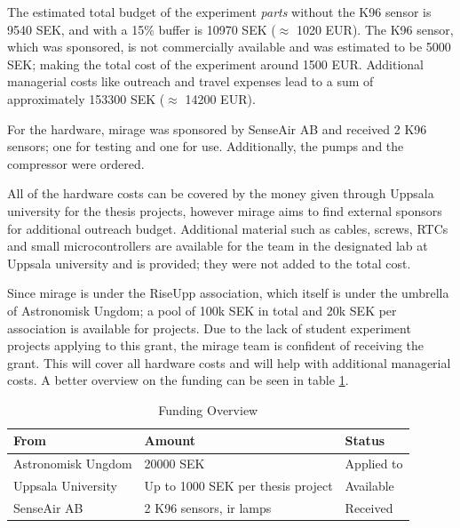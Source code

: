 The estimated total budget of the experiment \emph{parts} without the K96 sensor is 9540 SEK, and with a 15\% buffer is 10970 SEK ($\approx$ 1020 EUR). The K96 sensor, which was sponsored, is not commercially available and was estimated to be 5000 SEK; making the total cost of the experiment around 1500 EUR. Additional managerial costs like outreach and travel expenses lead to a sum of approximately 153300 SEK ($\approx$ 14200 EUR).

For the hardware, \gls{mirage} was sponsored by SenseAir AB and received 2 K96 sensors; one for testing and one for use. Additionally, the pumps and the compressor were ordered.

All of the hardware costs can be covered by the money given through Uppsala university for the thesis projects, however \gls{mirage} aims to find external sponsors for additional outreach budget. Additional material such as cables, screws, RTCs and small microcontrollers are available for the team in the designated lab at Uppsala university and is provided; they were not added to the total cost.

Since \gls{mirage} is under the RiseUpp association, which itself is under the umbrella of Astronomisk Ungdom; a pool of 100k SEK in total and 20k SEK per association is available for projects.
Due to the lack of student experiment projects applying to this grant, the \gls{mirage} team is confident of receiving the grant. This will cover all hardware costs and will help with additional managerial costs.
A better overview on the funding can be seen in table \ref{tab:funding}.

\begin{table}[htbp]
\centering
\caption{Funding Overview}
\label{tab:funding}
\begin{tabular}{p{4cm}p{6cm}p{3cm}}
\toprule
\textbf{From} & \textbf{Amount} & \textbf{Status} \\
\midrule
Astronomisk Ungdom & 20000 SEK & Applied to \\
Uppsala University & Up to 1000 SEK per thesis project & Available \\
SenseAir AB & 2 K96 sensors, \gls{ir} lamps & Received
\end{tabular}
\end{table}

